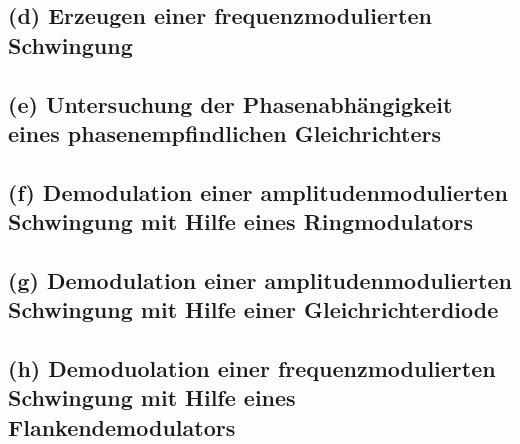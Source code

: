 \subsection{(d) Erzeugen einer frequenzmodulierten Schwingung}
\label{subsec:durchfuehrung_d}


\subsection{(e) Untersuchung der Phasenabhängigkeit eines
phasenempfindlichen Gleichrichters}
\label{subsec:durchfuehrung_e}


\subsection{(f) Demodulation einer amplitudenmodulierten Schwingung
mit Hilfe eines Ringmodulators}
\label{subsec:durchfuehrung_f}


\subsection{(g) Demodulation einer amplitudenmodulierten Schwingung
mit Hilfe einer Gleichrichterdiode}
\label{subsec:durchfuehrung_g}


\subsection{(h) Demoduolation einer frequenzmodulierten Schwingung
mit Hilfe eines Flankendemodulators}
\label{subsec:durchfuehrung_h}
